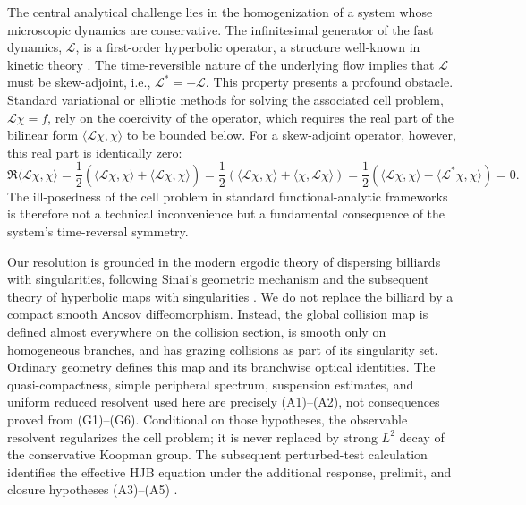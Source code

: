 \documentclass[12pt, letterpaper]{amsart}
\newcommand{\Lcal}{\mathcal{L}}
\newcommand{\scpr}[2]{\langle #1, #2 \rangle}
\theoremstyle{plain}
\theoremstyle{definition}
\theoremstyle{remark}
\begin{document}
The central analytical challenge lies in the homogenization of a system whose microscopic dynamics are conservative. The infinitesimal generator of the fast dynamics, $\Lcal$, is a first-order hyperbolic operator, a structure well-known in kinetic theory \citep{GallagherSaintRaymondTexier2013}. The time-reversible nature of the underlying flow implies that $\Lcal$ must be skew-adjoint, i.e., $\Lcal^* = -\Lcal$. This property presents a profound obstacle. Standard variational or elliptic methods for solving the associated cell problem, $\Lcal \chi = f$, rely on the coercivity of the operator, which requires the real part of the bilinear form $\scpr{\Lcal \chi}{\chi}$ to be bounded below. For a skew-adjoint operator, however, this real part is identically zero:
\begin{equation}
    \Re\scpr{\Lcal \chi}{\chi} = \frac{1}{2}(\scpr{\Lcal \chi}{\chi} + \overline{\scpr{\Lcal \chi}{\chi}}) = \frac{1}{2}(\scpr{\Lcal \chi}{\chi} + \scpr{\chi}{\Lcal \chi}) = \frac{1}{2}(\scpr{\Lcal \chi}{\chi} - \scpr{\Lcal^* \chi}{\chi}) = 0.
\end{equation}
The ill-posedness of the cell problem in standard functional-analytic frameworks is therefore not a technical inconvenience but a fundamental consequence of the system's time-reversal symmetry.

Our resolution is grounded in the modern ergodic theory of dispersing billiards with singularities, following Sinai's geometric mechanism and the subsequent theory of hyperbolic maps with singularities \citep{Sinai1970,KatokStrelcyn1986,chernov2006chaotic,ChernovZhang2009,DemersLiverani2008,BaladiDemersLiverani2018}.  We do not replace the billiard by a compact smooth Anosov diffeomorphism.  Instead, the global collision map is defined almost everywhere on the collision section, is smooth only on homogeneous branches, and has grazing collisions as part of its singularity set.  Ordinary geometry defines this map and its branchwise optical identities.  The quasi-compactness, simple peripheral spectrum, suspension estimates, and uniform reduced resolvent used here are precisely \textup{(A1)--(A2)}, not consequences proved from \textup{(G1)--(G6)}.  Conditional on those hypotheses, the observable resolvent regularizes the cell problem; it is never replaced by strong $L^2$ decay of the conservative Koopman group.  The subsequent perturbed-test calculation identifies the effective HJB equation under the additional response, prelimit, and closure hypotheses \textup{(A3)--(A5)} \citep{Evans1992, CrandallIshiiLions1992}.
\end{document}
